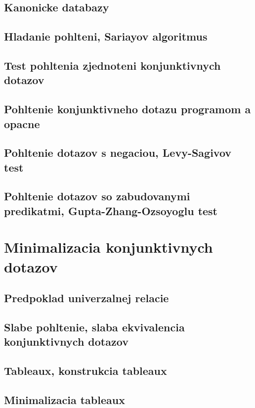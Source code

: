 \documentclass[12pt,a4paper]{article}
\begin{document}
\subsection{Kanonicke databazy}

\subsection{Hladanie pohlteni, Sariayov algoritmus}

\subsection{Test pohltenia zjednoteni konjunktivnych dotazov}

\subsection{Pohltenie konjunktivneho dotazu programom a opacne}

\subsection{Pohltenie dotazov s negaciou, Levy-Sagivov test}

\subsection{Pohltenie dotazov so zabudovanymi predikatmi, Gupta-Zhang-Ozsoyoglu test}

\section{Minimalizacia konjunktivnych dotazov}

\subsection{Predpoklad univerzalnej relacie}

\subsection{Slabe pohltenie, slaba ekvivalencia konjunktivnych dotazov}

\subsection{Tableaux, konstrukcia tableaux}

\subsection{Minimalizacia tableaux}
\end{document}
